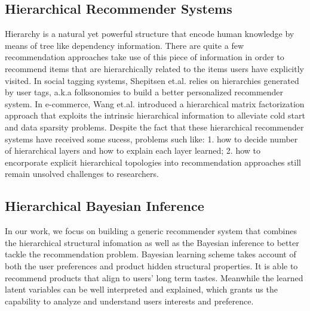 \subsection{Hierarchical Recommender Systems}
Hierarchy is a natural yet powerful structure that encode human knowledge by means of tree like dependency information.  There are quite a few recommendation approaches take use of this piece of information in order to recommend items that are hierarchically related to the items users have explicitly visited.  In social tagging systems, Shepitsen et.al. \cite{shepitsen2008personalized} relies on hierarchies generated by user tags, a.k.a folksonomies to build a better personalized recommender system.  In e-commerce, Wang et.al. \cite{wang2018exploring} introduced a hierarchical matrix factorization approach that exploits the intrinsic hierarchical information to alleviate cold start and data sparsity problems.  Despite the fact that these hierarchical recommender systems have received some sucess, problems such like: 1. how to decide number of hierarchical layers and how to explain each layer learned; 2. how to encorporate explicit hierarchical topologies into recommendation approaches still remain unsolved challenges to researchers.

\subsection{Hierarchical Bayesian Inference}
In our work, we focus on building a generic recommender system that combines the hierarchical structural infomation as well as the Bayesian inference to better tackle the recommendation problem.  Bayesian learning scheme takes account of both the user preferences and product hidden structural properties. It is able to recommend products that align to users' long term tastes. Meanwhile the learned latent variables can be well interpreted and explained, which grants us the capability to analyze and understand users interests and preference.

